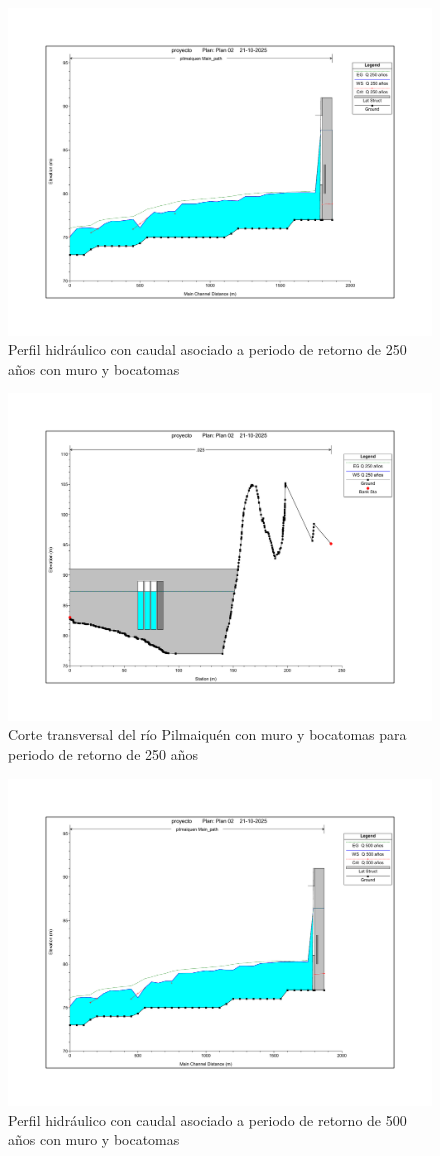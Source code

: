 \documentclass{article} %
\begin{document}
\begin{figure}[H]
    \centering
    \includegraphics[width=0.6\linewidth]{imagenes/perfil_250_cb.pdf}
    \caption{Perfil hidráulico con caudal asociado a periodo de retorno de 250 años con muro y bocatomas}
\end{figure}

\begin{figure}[H]
    \centering
    \includegraphics[width=0.6\linewidth]{imagenes/corte_250_cb.pdf}
    \caption{Corte transversal del río Pilmaiquén con muro y bocatomas para periodo de retorno de 250 años}
\end{figure}

\begin{figure}[H]
    \centering
    \includegraphics[width=0.6\linewidth]{imagenes/perfil_500_cb.pdf}
    \caption{Perfil hidráulico con caudal asociado a periodo de retorno de 500 años con muro y bocatomas}
\end{figure}
\end{document}
